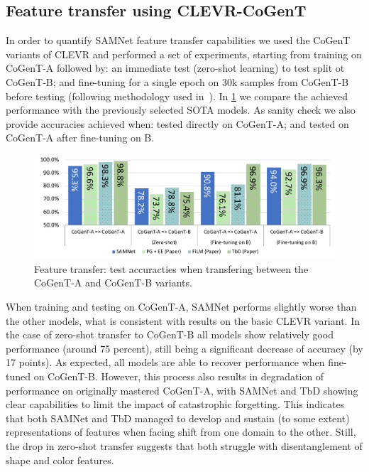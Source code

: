 \subsection{Feature transfer using CLEVR-CoGenT}
\label{sec:feature}

In order to quantify SAMNet feature transfer capabilities we used the CoGenT variants of CLEVR and performed a set of experiments, starting from training on CoGenT-A followed by:
an immediate test (zero-shot learning) to test split ot CoGenT-B; and fine-tuning for a single epoch on 30k samples from CoGenT-B before testing (following methodology used in~\cite{johnson2017inferring, mascharka2018transparency, perez2018film, marois2018transfer}).
In \cref{fig:CoGenT-B-results} we compare the achieved performance with the previously selected SOTA models. 
As sanity check we also provide accuracies achieved when: tested directly on CoGenT-A; and tested on CoGenT-A after fine-tuning on B.

\begin{figure}[htbp]
	\centering
	\includegraphics[width=\columnwidth]{../img/plots/cogent_feature_transfer_baselines.pdf}
	\caption{Feature transfer: test accuracties when transfering between the CoGenT-A and CoGenT-B variants.}
	\label{fig:CoGenT-B-results}
\end{figure}

When training and testing on CoGenT-A, SAMNet performs slightly worse than the other models, what is consistent with results on the basic CLEVR variant.
In the case of zero-shot transfer to CoGenT-B all models show relatively good performance (around 75 percent), still being a significant decrease of accuracy (by 17 points).
As expected, all models are able to recover performance when fine-tuned on CoGenT-B.
However, this process also results in degradation of performance on originally mastered CoGenT-A, with SAMNet and TbD showing clear capabilities to limit the impact of catastrophic forgetting.
This indicates that both SAMNet and TbD managed to develop and sustain (to some extent) representations of features when facing shift from one domain to the other.
Still, the drop in zero-shot transfer suggests that both struggle with disentanglement of shape and color features.

